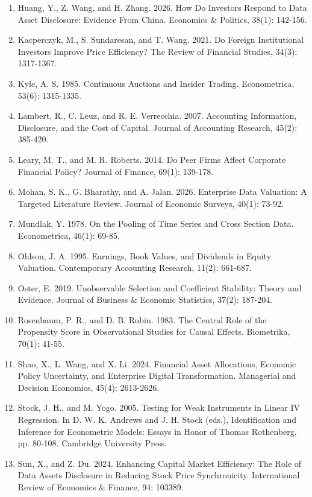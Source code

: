\begin{enumerate}
\item
  Huang, Y., Z. Wang, and H. Zhang. 2026. How Do Investors Respond to Data Asset Disclosure: Evidence From China. Economics \& Politics, 38(1): 142-156.
\item
  Kacperczyk, M., S. Sundaresan, and T. Wang. 2021. Do Foreign Institutional Investors Improve Price Efficiency? The Review of Financial Studies, 34(3): 1317-1367.
\item
  Kyle, A. S. 1985. Continuous Auctions and Insider Trading. Econometrica, 53(6): 1315-1335.
\item
  Lambert, R., C. Leuz, and R. E. Verrecchia. 2007. Accounting Information, Disclosure, and the Cost of Capital. Journal of Accounting Research, 45(2): 385-420.
\item
  Leary, M. T., and M. R. Roberts. 2014. Do Peer Firms Affect Corporate Financial Policy? Journal of Finance, 69(1): 139-178.
\item
  Mohan, S. K., G. Bharathy, and A. Jalan. 2026. Enterprise Data Valuation: A Targeted Literature Review. Journal of Economic Surveys, 40(1): 73-92.
\item
  Mundlak, Y. 1978. On the Pooling of Time Series and Cross Section Data. Econometrica, 46(1): 69-85.
\item
  Ohlson, J. A. 1995. Earnings, Book Values, and Dividends in Equity Valuation. Contemporary Accounting Research, 11(2): 661-687.
\item
  Oster, E. 2019. Unobservable Selection and Coefficient Stability: Theory and Evidence. Journal of Business \& Economic Statistics, 37(2): 187-204.
\item
  Rosenbaum, P. R., and D. B. Rubin. 1983. The Central Role of the Propensity Score in Observational Studies for Causal Effects. Biometrika, 70(1): 41-55.
\item
  Shao, X., L. Wang, and X. Li. 2024. Financial Asset Allocations, Economic Policy Uncertainty, and Enterprise Digital Transformation. Managerial and Decision Economics, 45(4): 2613-2626.
\item
  Stock, J. H., and M. Yogo. 2005. Testing for Weak Instruments in Linear IV Regression. In D. W. K. Andrews and J. H. Stock (eds.), Identification and Inference for Econometric Models: Essays in Honor of Thomas Rothenberg, pp. 80-108. Cambridge University Press.
\item
  Sun, X., and Z. Du. 2024. Enhancing Capital Market Efficiency: The Role of Data Assets Disclosure in Reducing Stock Price Synchronicity. International Review of Economics \& Finance, 94: 103389.

\end{enumerate}
